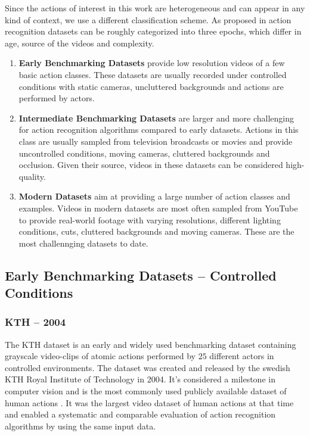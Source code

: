 Since the actions of interest in this work are heterogeneous and can appear in any kind of context, we use a different classification scheme.
As proposed in \cite{hassner_critical_2013} action recognition datasets can be roughly categorized into three epochs, which differ in age, source of the videos and complexity.
\begin{enumerate}
    \item \textbf{Early Benchmarking Datasets} provide low resolution videos of a few basic action classes. These datasets are usually recorded under controlled conditions with static cameras, uncluttered backgrounds and actions are performed by actors.
    \item \textbf{Intermediate Benchmarking Datasets} are larger and more challenging for action recognition algorithms compared to early datasets. Actions in this class are usually sampled from television broadcasts or movies and provide uncontrolled conditions, moving cameras, cluttered backgrounds and occlusion. Given their source, videos in these datasets can be considered high-quality.
    \item \textbf{Modern Datasets} aim at providing a large number of action classes and examples. Videos in modern datasets are most often sampled from YouTube to provide real-world footage with varying resolutions, different lighting conditions, cuts, cluttered backgrounds and moving cameras. These are the most challennging datasets to date.
\end{enumerate}


\subsection{Early Benchmarking Datasets -- Controlled Conditions}

\subsubsection{KTH -- 2004}
The KTH dataset \cite{schuldt_recognizing_2004} is an early and widely used benchmarking dataset containing grayscale video-clips of atomic actions performed by $25$ different actors in controlled environments.
The dataset was created and released by the swedish KTH Royal Institute of Technology in 2004.
It's considered a milestone in computer vision \cite{chaquet_survey_2013} and is the most commonly used publicly available dataset of human actions \cite{baccouche_sequential_2011}.
It was the largest video dataset of human actions at that time and enabled a systematic and comparable evaluation of action recognition algorithms by using the same input data.

